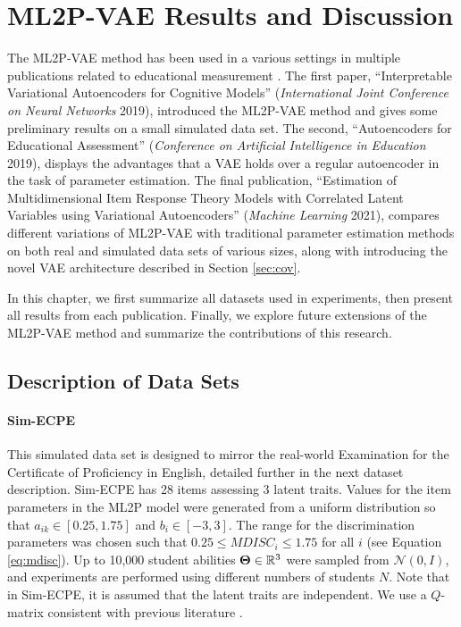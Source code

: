 \chapter{ML2P-VAE Results and Discussion}\label{ch:ml2pvae_results}

The ML2P-VAE method has been used in a various settings in multiple publications related to educational measurement \cite{aied_paper, ml_paper, ijcnn_paper}. The first paper, ``Interpretable Variational Autoencoders for Cognitive Models'' (\textit{International Joint Conference on Neural Networks} 2019), introduced the ML2P-VAE method and gives some preliminary results on a small simulated data set. The second, ``Autoencoders for Educational Assessment'' (\textit{Conference on Artificial Intelligence in Education} 2019), displays the advantages that a VAE holds over a regular autoencoder in the task of parameter estimation. The final publication, ``Estimation of Multidimensional Item Response Theory Models with Correlated Latent Variables using Variational Autoencoders'' (\textit{Machine Learning} 2021), compares different variations of ML2P-VAE with traditional parameter estimation methods on both real and simulated data sets of various sizes, along with introducing the novel VAE architecture described in Section \ref{sec:cov}.

In this chapter, we first summarize all datasets used in experiments, then present all results from each publication. Finally, we explore future extensions of the ML2P-VAE method and summarize the contributions of this research.

\section{Description of Data Sets}\label{sec:irt_data}
\subsubsection*{Sim-ECPE} This simulated data set is designed to mirror the real-world Examination for the Certificate of Proficiency in English, detailed further in the next dataset description. Sim-ECPE has 28 items assessing 3 latent traits. Values for the item parameters in the ML2P model were generated from a uniform distribution so that $a_{ik} \in [0.25, 1.75]$ and $b_i \in [-3,3]$. The range for the discrimination parameters was chosen such that $0.25 \leq MDISC_i \leq 1.75$ for all $i$ (see Equation \ref{eq:mdisc}). Up to 10,000 student abilities $\boldsymbol{\Theta} \in \mathbb{R}^3$ were sampled from $\mathcal{N}(0,I)$, and experiments are performed using different numbers of students $N$. Note that in Sim-ECPE, it is assumed that the latent traits are independent. We use a $Q$-matrix consistent with previous literature \cite{daSilva2018, templin2013, henson2007}.

